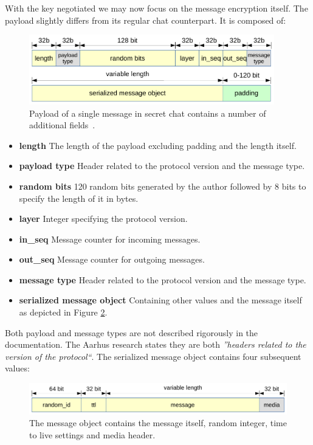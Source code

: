 \documentclass[thesis=M,english]{FITthesis}[2012/10/20]
\begin{document}
With the key negotiated we may now focus on the message encryption itself. The payload slightly differs from its regular chat counterpart. It is composed of:

\begin{figure}[htb]
	\centering
	\includegraphics[width=0.95\textwidth]{secret-payload.pdf}
	\caption[Message payload in secret chats]{Payload of a single message in secret chat contains a number of additional fields~\cite{telegram-aarhus}.}
	\label{img:crypto-secret-payload}
\end{figure}

\begin{itemize}
	\item  \textbf{length} The length of the payload excluding padding and the length itself.
	\item  \textbf{payload type} Header related to the protocol version and the message type.
	\item  \textbf{random bits} 120 random bits generated by the author followed by 8 bits to specify the length of it in bytes.
	\item  \textbf{layer} Integer specifying the protocol version.
	\item  \textbf{in\_seq} Message counter for incoming messages.
	\item  \textbf{out\_seq} Message counter for outgoing messages.
	\item  \textbf{message type} Header related to the protocol version and the message type.
	\item  \textbf{serialized message object} Containing other values and the message itself as depicted in Figure \ref{img:crypto-secret-messageobject}.
\end{itemize}

Both payload and message types are not described rigorously in the documentation. The Aarhus research \cite{telegram-aarhus} states they are both \emph{''headers related to the version of the protocol``}. The serialized message object contains four subsequent values:

\begin{figure}[htb]
	\centering
	\includegraphics[width=1\textwidth]{decrypted-message.pdf}
	\caption[Message object]{The message object contains the message itself, random integer, time to live settings and media header.}
	\label{img:crypto-secret-messageobject}
\end{figure}
\end{document}
